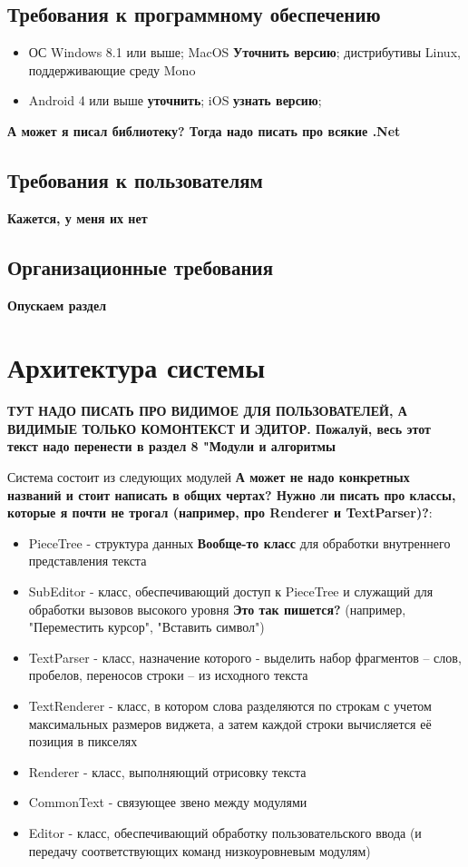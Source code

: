 \documentclass{fefu}
\begin{document}
		\subsection{Требования к программному обеспечению}
			\begin{itemize}
				\item ОС Windows 8.1 или выше; MacOS \textbf{Уточнить версию}; дистрибутивы 
				Linux, поддерживающие среду Mono
				\item Android 4 или выше \textbf{уточнить}; iOS \textbf{узнать версию};
			\end{itemize}
			\textbf{А может я писал библиотеку? Тогда надо писать про всякие .Net}
		\subsection{Требования к пользователям}
			\textbf{Кажется, у меня их нет}
		\subsection{Организационные требования}
			\textbf{Опускаем раздел}
	\section{Архитектура системы}
		\par \textbf{ТУТ НАДО ПИСАТЬ ПРО ВИДИМОЕ ДЛЯ ПОЛЬЗОВАТЕЛЕЙ, А ВИДИМЫЕ ТОЛЬКО 
		КОМОНТЕКСТ И ЭДИТОР. Пожалуй, весь этот текст надо перенести в раздел 8 "Модули и
		алгоритмы}
		\par Система состоит из следующих модулей \textbf{А может не надо конкретных названий
		и стоит написать в общих чертах? Нужно ли писать про классы, которые я почти не 
		трогал (например, про Renderer и TextParser)?}:
		
		\begin{itemize}
			\item PieceTree - структура данных \textbf{Вообще-то класс} для обработки 
			внутреннего представления текста
			\item SubEditor - класс, обеспечивающий доступ к PieceTree и служащий для 
			обработки вызовов высокого уровня \textbf{Это так пишется?} (например, 
			"Переместить курсор", "Вставить символ")
			\item TextParser - класс, назначение которого - выделить набор фрагментов -- слов, 
			пробелов, переносов строки -- из исходного текста
			\item TextRenderer - класс, в котором слова разделяются по строкам с учетом 
			максимальных размеров виджета, а затем каждой строки вычисляется её позиция 
			в пикселях
			\item Renderer - класс, выполняющий отрисовку текста
			\item CommonText - связующее звено между модулями
			\item Editor - класс, обеспечивающий обработку пользовательского ввода (и 
			передачу соответствующих команд низкоуровневым модулям)
		\end{itemize}
\end{document}
